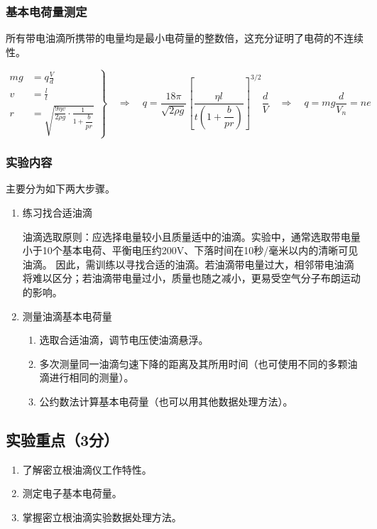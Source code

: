 \documentclass[10pt,a4paper]{ctexart} %
\begin{document}
    \subsubsection{基本电荷量测定}
    所有带电油滴所携带的电量均是最小电荷量的整数倍，这充分证明了电荷的不连续性。

    \[
    \left.
    \begin{aligned}
    mg &= q\frac{V}{d} \\[1em]
    v &= \frac{l}{t} \\[1em]
    r &= \sqrt{
        \frac{9\eta v}{2\rho g}
        \cdot
        \frac{1}{1+\dfrac{b}{pr}}
    }
    \end{aligned}
    \right\}
    \quad\Longrightarrow\quad
    q = \frac{18\pi}{\sqrt{2\rho g}}
        \left[
            \frac{\eta l}{t\left(1+\dfrac{b}{pr}\right)}
        \right]^{3/2}
        \frac{d}{V}
    \quad\Longrightarrow\quad
    q = mg\frac{d}{V_n} = ne
    \]

    \subsubsection{实验内容}
    主要分为如下两大步骤。
    \begin{enumerate}
      \item 练习找合适油滴
      
      油滴选取原则：应选择电量较小且质量适中的油滴。实验中，通常选取带电量小于10个基本电荷、平衡电压约200V、下落时间在10秒/毫米以内的清晰可见油滴。
      因此，需训练以寻找合适的油滴。若油滴带电量过大，相邻带电油滴将难以区分；若油滴带电量过小，质量也随之减小，更易受空气分子布朗运动的影响。
      
      \item 测量油滴基本电荷量
      \begin{enumerate}
         \item 选取合适油滴，调节电压使油滴悬浮。
         \item 多次测量同一油滴匀速下降的距离及其所用时间（也可使用不同的多颗油滴进行相同的测量）。
         \item 公约数法计算基本电荷量（也可以用其他数据处理方法）。
      \end{enumerate}
    \end{enumerate} 

  \subsection{实验重点（3分）}
  \begin{enumerate}
    \item 了解密立根油滴仪工作特性。
    \item 测定电子基本电荷量。
    \item 掌握密立根油滴实验数据处理方法。
  \end{enumerate}
\end{document}
